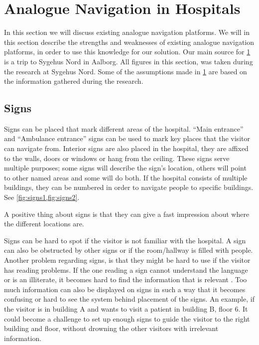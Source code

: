 \section{Analogue Navigation in Hospitals} %
\label{sec:anal_nav}
In this section we will discuss existing analogue navigation platforms. We will in this section describe the strengths and weaknesses of existing analogue navigation platforms, in order to use this knowledge for our solution. Our main source for \cref{sec:anal_nav} is a trip to Sygehus Nord in Aalborg. All figures in this section, was taken during the research at Sygehus Nord. Some of the assumptions made in \cref{sec:anal_nav} are based on the information gathered during the research. 

\subsection{Signs} \label{sub:sign}
Signs can be placed that mark different areas of the hospital. \enquote{Main entrance} and \enquote{Ambulance entrance}\cite{signs_hospital} signs can be used to mark key places that the visitor can navigate from\cite{art_Osborne}.
Interior signs are also placed in the hospital, they are affixed to the walls, doors or windows or hang from the ceiling. These signs serve multiple purposes; some signs will describe the sign's location, others will point to other named areas and some will do both. 
If the hospital consists of multiple buildings, they can be numbered in order to navigate people to specific buildings. See \cref{fig:signs1,fig:signs2}.

A positive thing about signs is that they can give a fast impression about where the different locations are.

Signs can be hard to spot if the visitor is not familiar with the hospital. A sign can also be obstructed by other signs or if the room/hallway is filled with people. Another problem regarding signs, is that they might be hard to use if the visitor has reading problems. If the one reading a sign cannot understand the language or is an illiterate, it becomes hard to find the information that is relevant \cite{signs_reading}. Too much information can also be displayed on signs in such a way that it becomes confusing or hard to see the system behind placement of the signs.
An example, if the visitor is in building A and wants to visit a patient in building B, floor 6. It could become a challenge to set up enough signs to guide the visitor to the right building and floor, without drowning the other visitors with irrelevant information.

